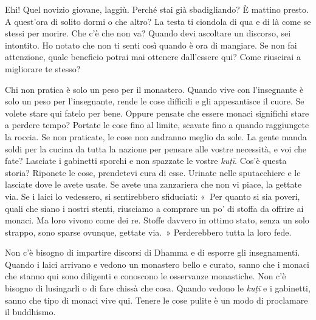 Ehi! Quel novizio giovane, laggiù. Perché stai già sbadigliando? È
mattino presto. A quest'ora di solito dormi o che altro? La testa ti
ciondola di qua e di là come se stessi per morire. Che c'è che non va?
Quando devi ascoltare un discorso, sei intontito. Ho notato che non ti
senti così quando è ora di mangiare. Se non fai attenzione, quale
beneficio potrai mai ottenere dall'essere qui? Come riuscirai a
migliorare te stesso?

Chi non pratica è solo un peso per il monastero. Quando vive con
l'insegnante è solo un peso per l'insegnante, rende le cose difficili e
gli appesantisce il cuore. Se volete stare qui fatelo per bene. Oppure
pensate che essere monaci significhi stare a perdere tempo? Portate le
cose fino al limite, scavate fino a quando raggiungete la roccia. Se non
praticate, le cose non andranno meglio da sole. La gente manda soldi per
la cucina da tutta la nazione per pensare alle vostre necessità, e voi
che fate? Lasciate i gabinetti sporchi e non spazzate le vostre
\emph{kuṭī}. Cos'è questa storia? Riponete le cose, prendetevi cura di
esse. Urinate nelle sputacchiere e le lasciate dove le avete usate. Se
avete una zanzariera che non vi piace, la gettate via. Se i laici lo
vedessero, si sentirebbero sfiduciati: «~Per quanto si sia poveri, quali
che siano i nostri stenti, riusciamo a comprare un po' di stoffa da
offrire ai monaci. Ma loro vivono come dei re. Stoffe davvero in ottimo
stato, senza un solo strappo, sono sparse ovunque, gettate via.~»
Perderebbero tutta la loro fede.

Non c'è bisogno di impartire discorsi di Dhamma e di esporre gli
insegnamenti. Quando i laici arrivano e vedono un monastero bello e
curato, sanno che i monaci che stanno qui sono diligenti e conoscono le
osservanze monastiche. Non c'è bisogno di lusingarli o di fare chissà
che cosa. Quando vedono le \emph{kuṭī} e i gabinetti, sanno che tipo di
monaci vive qui. Tenere le cose pulite è un modo di proclamare il
buddhismo.

